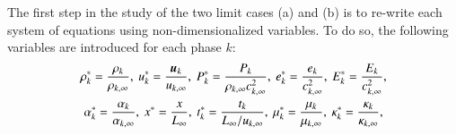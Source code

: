\documentclass[preprint,10pt]{elsarticle}
\begin{document}
%
The first step in the study of the two limit cases (a) and (b) is to re-write each system of equations using non-dimensionalized variables. To do so, the following variables are introduced for each phase $k$:
%
\begin{multline}
\label{eq:norm_param}
\rho_k^*   = \frac{\rho_k}{\rho_{k,\infty}}           ,\
u_k^*      = \frac{\boldsymbol u_k}{u_{k,\infty}}                 ,\
P_k^*      = \frac{P_k}{\rho_{k,\infty} c^2_{k,\infty}}   ,\
e_k^*      = \frac{e_k}{c^2_{k,\infty} }              , \
E_k^*      = \frac{E_k}{c^2_{k,\infty} }              , \\
\alpha_k^*      = \frac{\alpha_k}{\alpha_{k,\infty} }              , \
x^* = \frac{x}{L_\infty}                      ,\
t_k^* = \frac{t_k}{L_\infty / u_{k,\infty}}           ,\
\mu_k^*    = \frac{\mu_k}{\mu_{k,\infty}}             ,\
\kappa_k^* = \frac{\kappa_k}{\kappa_{k,\infty}}       ,\\
\end{multline}
\end{document}
